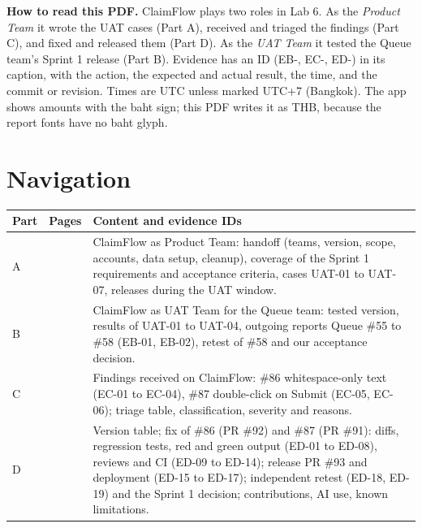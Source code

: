 \medskip
\noindent\textbf{How to read this PDF.}
ClaimFlow plays two roles in Lab 6.
As the \emph{Product Team} it wrote the UAT cases (Part A), received and triaged the findings (Part C), and fixed and released them (Part D).
As the \emph{UAT Team} it tested the Queue team's Sprint 1 release (Part B).
Evidence has an ID (EB-, EC-, ED-) in its caption, with the action, the expected and actual result, the time, and the commit or revision.
Times are UTC unless marked UTC+7 (Bangkok).
The app shows amounts with the baht sign; this PDF writes it as THB, because the report fonts have no baht glyph.

\clearpage
\section*{Navigation}
\renewcommand{\arraystretch}{1.25}
\begin{longtable}{@{}R{0.9cm}R{2.5cm}R{12.6cm}@{}}
\toprule \textbf{Part} & \textbf{Pages} & \textbf{Content and evidence IDs} \\ \midrule \endhead
A &  & ClaimFlow as Product Team: handoff (teams, version, scope, accounts, data setup, cleanup), coverage of the Sprint 1 requirements and acceptance criteria, cases UAT-01 to UAT-07, releases during the UAT window. \\
B &  & ClaimFlow as UAT Team for the Queue team: tested version, results of UAT-01 to UAT-04, outgoing reports Queue \#55 to \#58 (EB-01, EB-02), retest of \#58 and our acceptance decision. \\
C &  & Findings received on ClaimFlow: \#86 whitespace-only text (EC-01 to EC-04), \#87 double-click on Submit (EC-05, EC-06); triage table, classification, severity and reasons. \\
D &  & Version table; fix of \#86 (PR \#92) and \#87 (PR \#91): diffs, regression tests, red and green output (ED-01 to ED-08), reviews and CI (ED-09 to ED-14); release PR \#93 and deployment (ED-15 to ED-17); independent retest (ED-18, ED-19) and the Sprint 1 decision; contributions, AI use, known limitations. \\
\bottomrule
\end{longtable}

\tableofcontents
